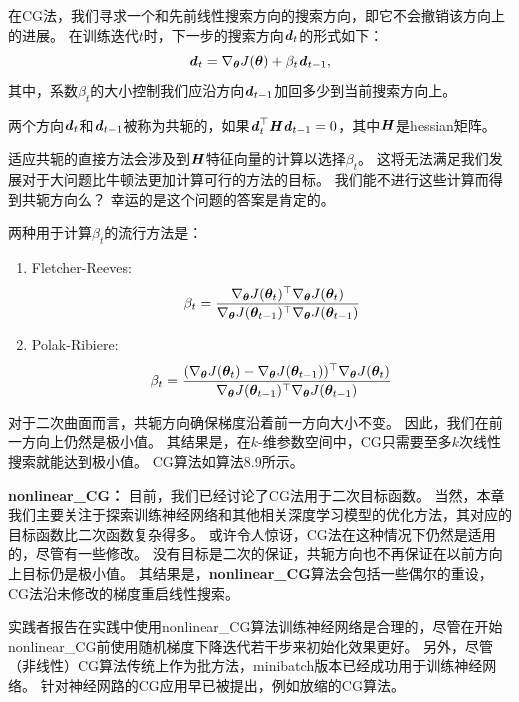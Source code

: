 在\gls{CG}法，我们寻求一个和先前线性搜索方向的搜索方向，即它不会撤销该方向上的进展。
在训练迭代$t$时，下一步的搜索方向$\boldsymbol{\mathit{d}}_t$的形式如下：
\begin{equation}
    \boldsymbol{\mathit{d}}_t = \nabla_{\boldsymbol{\theta}} J(\boldsymbol{\theta}) + \beta_t \boldsymbol{\mathit{d}}_{t-1},
\end{equation}
其中，系数$\beta_t$的大小控制我们应沿方向$\boldsymbol{\mathit{d}}_{t-1}$加回多少到当前搜索方向上。


两个方向$\boldsymbol{\mathit{d}}_t$和$\boldsymbol{\mathit{d}}_{t-1}$被称为共轭的，如果$\boldsymbol{\mathit{d}}_t^\top \boldsymbol{\mathit{H}} \boldsymbol{\mathit{d}}_{t-1} = 0$，其中$\boldsymbol{\mathit{H}}$是\gls{hessian}矩阵。

适应共轭的直接方法会涉及到$\boldsymbol{\mathit{H}}$特征向量的计算以选择$\beta_t$。
这将无法满足我们发展对于大问题比牛顿法更加计算可行的方法的目标。
我们能不进行这些计算而得到共轭方向么？
幸运的是这个问题的答案是肯定的。

两种用于计算$\beta_t$的流行方法是：
\begin{enumerate}
\item Fletcher-Reeves:
\begin{equation}
    \beta_t = \frac{ \nabla_{\boldsymbol{\theta}} J(\boldsymbol{\theta}_t)^\top \nabla_{\boldsymbol{\theta}} J(\boldsymbol{\theta}_t) }
{ \nabla_{\boldsymbol{\theta}} J(\boldsymbol{\theta}_{t-1})^\top \nabla_{\boldsymbol{\theta}} J(\boldsymbol{\theta}_{t-1}) }
\end{equation}

\item Polak-Ribiere:
\begin{equation}
    \beta_t = \frac{ (\nabla_{\boldsymbol{\theta}} J(\boldsymbol{\theta}_t) - \nabla_{\boldsymbol{\theta}} J(\boldsymbol{\theta}_{t-1}))^\top \nabla_{\boldsymbol{\theta}} J(\boldsymbol{\theta}_t) }
{ \nabla_{\boldsymbol{\theta}} J(\boldsymbol{\theta}_{t-1})^\top \nabla_{\boldsymbol{\theta}} J(\boldsymbol{\theta}_{t-1}) }
\end{equation}
\end{enumerate}
对于二次曲面而言，共轭方向确保梯度沿着前一方向大小不变。
因此，我们在前一方向上仍然是极小值。
其结果是，在$k$-维参数空间中，\gls{CG}只需要至多$k$次线性搜索就能达到极小值。
\gls{CG}算法如算法8.9所示。

\textbf{\gls{nonlinear_CG}：}
目前，我们已经讨论了\gls{CG}法用于二次目标函数。
当然，本章我们主要关注于探索训练神经网络和其他相关深度学习模型的优化方法，其对应的目标函数比二次函数复杂得多。
或许令人惊讶，\gls{CG}法在这种情况下仍然是适用的，尽管有一些修改。
没有目标是二次的保证，共轭方向也不再保证在以前方向上目标仍是极小值。
其结果是，\textbf{\gls{nonlinear_CG}}算法会包括一些偶尔的重设，\gls{CG}法沿未修改的梯度重启线性搜索。


实践者报告在实践中使用\gls{nonlinear_CG}算法训练神经网络是合理的，尽管在开始\gls{nonlinear_CG}前使用随机梯度下降迭代若干步来初始化效果更好。
另外，尽管（非线性）\gls{CG}算法传统上作为批方法，\gls{minibatch}版本已经成功用于训练神经网络\citep{LeRoux-chapter-2011}。
针对神经网路的\gls{CG}应用早已被提出，例如放缩的\gls{CG}算法\citep{Moller}。

